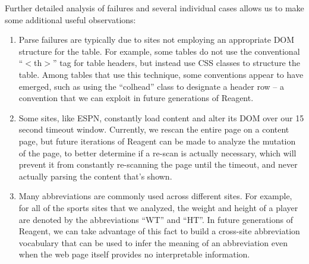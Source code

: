 Further detailed analysis of failures and several individual cases allows us to make some additional useful observations:
\begin{enumerate}
    \item Parse failures are typically due to sites not employing an appropriate DOM structure for the table. For example, some tables do not use the conventional ``$<$th$>$'' tag for table headers, but instead use CSS classes to structure the table. Among tables that use this technique, some conventions appear to have emerged, such as using the ``colhead'' class to designate a header row -- a convention that we can exploit in future generations of Reagent.
    \item Some sites, like ESPN, constantly load content and alter its DOM over our 15 second timeout window. Currently, we rescan the entire page on a content page, but future iterations of Reagent can be made to analyze the mutation of the page, to better determine if a re-scan is actually necessary, which will prevent it from constantly re-scanning the page until the timeout, and never actually parsing the content that's shown.
    \item Many abbreviations are commonly used across different sites. For example, for all of the sports sites that we analyzed, the weight and height of a player are denoted by the abbreviations ``WT'' and ``HT''. In future generations of Reagent, we can take advantage of this fact to build a cross-site abbreviation vocabulary that can be used to infer the meaning of an abbreviation even when the web page itself provides no interpretable information.
\end{enumerate}